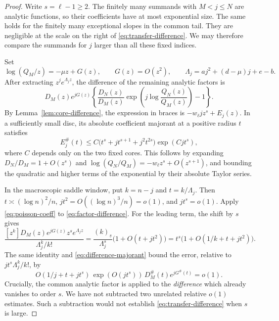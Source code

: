 \documentclass[11pt,a4paper]{article}
\numberwithin{equation}{section}
\theoremstyle{definition}
\theoremstyle{remark}
\newcommand{\fall}[2]{(#1)_{\underline{#2}}}
\begin{document}
\begin{proof}
Write $s=\ell-1\ge2$. The finitely many summands with $M<j\le N$ are
analytic functions, so their coefficients have at most exponential size.
The same holds for the finitely many exceptional slopes in the common tail.
They are negligible at the scale on the right of
\eqref{eq:transfer-difference}. We may therefore compare the summands for
$j$ larger than all these fixed indices.

Set
\[
 \log(Q_M/z)=-\mu z+G(z),\qquad G(z)=O(z^2),
 \qquad \Lambda_j=a j^2+(d-\mu)j+e-b.
\]
After extracting $z^j e^{\Lambda_jz}$, the difference of the remaining
analytic factors is
\begin{equation}
 D_M(z)e^{jG(z)}
 \left\{\frac{D_N(z)}{D_M(z)}
        \exp\!\left(j\log\frac{Q_N(z)}{Q_M(z)}\right)-1\right\}.
 \label{eq:factor-difference}
\end{equation}
By Lemma~\ref{lem:core-difference}, the expression in braces is
$-w_\ell j z^s+E_j(z)$. In a sufficiently small disc, its absolute
coefficient majorant at a positive radius $t$ satisfies
\begin{equation}
 E_j^{\#}(t)
 \le C\bigl(t^s+jt^{s+1}+j^2t^{2s}\bigr)
                     \exp(Cjt^s),
 \label{eq:difference-majorant}
\end{equation}
where $C$ depends only on the two fixed cores. This follows by expanding
$D_N/D_M=1+O(z^s)$ and
$\log(Q_N/Q_M)=-w_\ell z^s+O(z^{s+1})$, and bounding the quadratic and
higher terms of the exponential by their absolute Taylor series.

In the macroscopic saddle window, put $k=n-j$ and $t=k/\Lambda_j$.
Then $t\asymp(\log n)^2/n$,
$jt^2=O((\log n)^3/n)=o(1)$, and $jt^s=o(1)$.
Apply \eqref{eq:poisson-coeff} to \eqref{eq:factor-difference}.
For the leading term, the shift by $s$ gives
\[
 \frac{[z^k]D_M(z)e^{jG(z)}z^s e^{\Lambda_jz}}
      {\Lambda_j^k/k!}
 =\frac{\fall{k}{s}}{\Lambda_j^s}
    \bigl(1+O(t+jt^2)\bigr)
 =t^s\bigl(1+O(1/k+t+jt^2)\bigr).
\]
The same identity and \eqref{eq:difference-majorant} bound the error,
relative to $jt^s\Lambda_j^k/k!$, by
\[
 O(1/j+t+jt^s)\,\exp(O(jt^s))\,
          D_M^{\#}(t)e^{jG^{\#}(t)}=o(1).
\]
Crucially, the common analytic factor is applied to the \emph{difference}
which already vanishes to order $s$. We have not subtracted two unrelated
relative $o(1)$ estimates. Such a subtraction would not establish
\eqref{eq:transfer-difference} when $s$ is large.


\end{proof}
\end{document}
